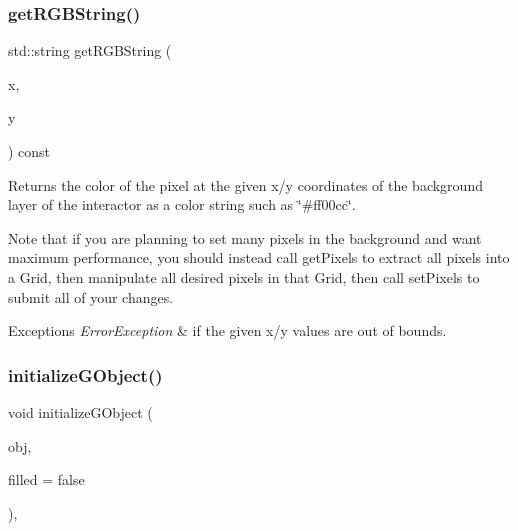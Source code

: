 \subsubsection{\texorpdfstring{get\+R\+G\+B\+String()}{getRGBString()}}
{\footnotesize\ttfamily std\+::string get\+R\+G\+B\+String (\begin{DoxyParamCaption}\item[{double}]{x,  }\item[{double}]{y }\end{DoxyParamCaption}) const\hspace{0.3cm}{\ttfamily [virtual]}}



Returns the color of the pixel at the given x/y coordinates of the background layer of the interactor as a color string such as \char`\"{}\#ff00cc\char`\"{}. 

Note that if you are planning to set many pixels in the background and want maximum performance, you should instead call get\+Pixels to extract all pixels into a Grid, then manipulate all desired pixels in that Grid, then call set\+Pixels to submit all of your changes.


\begin{DoxyExceptions}{Exceptions}
{\em Error\+Exception} & if the given x/y values are out of bounds. \\
\hline
\end{DoxyExceptions}
\mbox{\label{classsgl_1_1GDrawingSurface_a814498efebc5586645159cd22990cf61}} 
\subsubsection{\texorpdfstring{initialize\+G\+Object()}{initializeGObject()}\hspace{0.1cm}{\footnotesize\ttfamily [1/2]}}
{\footnotesize\ttfamily void initialize\+G\+Object (\begin{DoxyParamCaption}\item[{\mbox{\hyperlink{classsgl_1_1GObject}{G\+Object}} \&}]{obj,  }\item[{bool}]{filled = {\ttfamily false} }\end{DoxyParamCaption})\hspace{0.3cm}{\ttfamily [protected]}, {\ttfamily [virtual]}}



